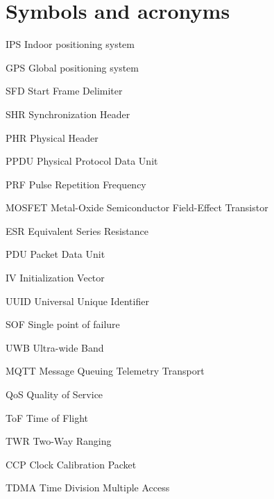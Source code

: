 \documentclass[\main/main.tex]{subfiles}
\begin{document}
\chapter*{Symbols and acronyms}
\begin{abbrv}
    \item[IPS]  Indoor positioning system
    \item[GPS]  Global positioning system 
    \item[SFD]  Start Frame Delimiter
    \item[SHR]  Synchronization Header
    \item[PHR]  Physical Header
    \item[PPDU] Physical Protocol Data Unit
    \item[PRF]  Pulse Repetition Frequency
    \item[MOSFET]  Metal-Oxide Semiconductor Field-Effect Transistor
    \item[ESR]  Equivalent Series Resistance
    \item[PDU] Packet Data Unit
    \item[IV] Initialization Vector
    \item[UUID] Universal Unique Identifier 
    \item[SOF] Single point of failure 
    \item[UWB] Ultra-wide Band 
    \item[MQTT] Message Queuing Telemetry Transport 
    \item[QoS] Quality of Service
    \item[ToF] Time of Flight
    \item[TWR] Two-Way Ranging
    \item[CCP] Clock Calibration Packet  
    \item[TDMA] Time Division Multiple Access 
\end{abbrv}
\end{document}
